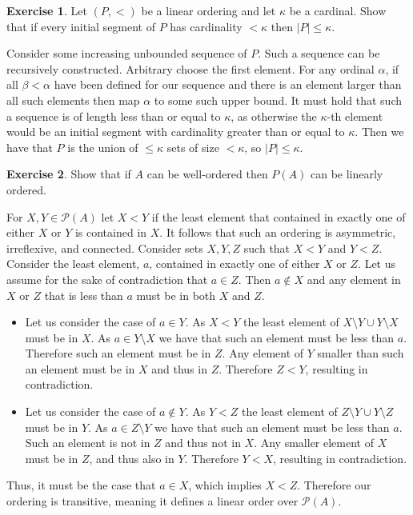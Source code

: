 \documentclass{article}
\theoremstyle{definition}
\newtheorem{exer}{Exercise}[section]
\newcommand{\powset}[1]{\mathcal{P}(#1)}
\newcommand{\abs}[1]{\lvert#1\rvert}
\newlength{\defparindent}
\newenvironment{answer}
    {\begin{mdframed}[backgroundcolor=gray!15, linewidth=0pt] \setlength{\parindent}{\defparindent}}
    {\end{mdframed}}
\begin{document}
\begin{exer}
    Let $(P, <)$ be a linear ordering and let $\kappa$ be a cardinal. Show that if every initial segment of $P$ has cardinality $< \kappa$ then $\abs{P} \le \kappa$.
    \begin{answer}
        Consider some increasing unbounded sequence of $P$. Such a sequence can be recursively constructed. Arbitrary choose the first element. For any ordinal $\alpha$, if all $\beta < \alpha$ have been defined for our sequence and there is an element larger than all such elements then map $\alpha$ to some such upper bound. It must hold that such a sequence is of length less than or equal to $\kappa$, as otherwise the $\kappa$-th element would be an initial segment with cardinality greater than or equal to $\kappa$. Then we have that $P$ is the union of $\le \kappa$ sets of size $< \kappa$, so $\abs{P} \le \kappa$. 
    \end{answer}
\end{exer}

\begin{exer}
    Show that if $A$ can be well-ordered then $P(A)$ can be linearly ordered.
    \begin{answer}
        For $X, Y \in \powset{A}$ let $X < Y$ if the least element that contained in exactly one of either $X$ or $Y$ is contained in $X$. It follows that such an ordering is asymmetric, irreflexive, and connected. Consider sets $X, Y, Z$ such that $X < Y$ and $Y < Z$. Consider the least element, $a$, contained in exactly one of either $X$ or $Z$. Let us assume for the sake of contradiction that $a \in Z$. Then $a \not\in X$ and any element in $X$ or $Z$ that is less than $a$ must be in both $X$ and $Z$. 
        \begin{itemize}
            \item Let us consider the case of $a \in Y$. As $X < Y$ the least element of $X \setminus Y \cup Y \setminus X$ must be in $X$. As $a \in Y \setminus X$ we have that such an element must be less than $a$. Therefore such an element must be in $Z$. Any element of $Y$ smaller than such an element must be in $X$ and thus in $Z$. Therefore $Z < Y$, resulting in contradiction.
            \item Let us consider the case of $a \not\in Y$. As $Y < Z$ the least element of $Z \setminus Y \cup Y \setminus Z$ must be in $Y$. As $a \in Z \setminus Y$ we have that such an element must be less than $a$. Such an element is not in $Z$ and thus not in $X$. Any smaller element of $X$ must be in $Z$, and thus also in $Y$. Therefore $Y < X$, resulting in contradiction.
        \end{itemize}
        Thus, it must be the case that $a \in X$, which implies $X < Z$. Therefore our ordering is transitive, meaning it defines a linear order over $\powset{A}$.
    \end{answer}
\end{exer}
\end{document}
